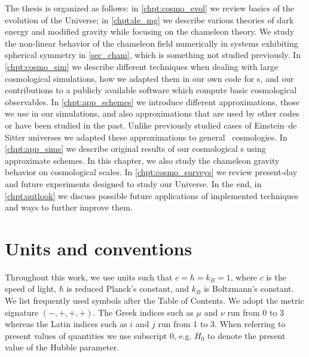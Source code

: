 The thesis is organized as follows: in \autoref{chpt:cosmo_evol} we review basics of the evolution of the Universe; in \autoref{chpt:de_mg} we describe various theories of dark energy and modified gravity while focusing on the chameleon theory. We study the non-linear behavior of the chameleon field numerically in systems exhibiting spherical symmetry in \autoref{sec_cham}, which is something not studied previously. In \autoref{chpt:cosmo_sim} we describe different techniques when dealing with large cosmological simulations, how we adapted them in our own code for \nbodysim s, and our contributions to a publicly available software  which compute basic cosmological observables. In \autoref{chpt:app_schemes} we introduce different approximations, those we use in our simulations, and also approximations that are used by other codes or have been studied in the past. Unlike previously studied cases of Einstein--de Sitter universes we adapted these approximations to general \LCDM\ cosmologies. In \autoref{chpt:app_sims} we describe original results of our cosmological \nbodysim s using approximate schemes. In this chapter, we also study the chameleon gravity behavior on cosmological scales. In \autoref{chpt:cosmo_surveys} we review present-day and future experiments designed to study our Universe. In the end, in \autoref{chpt:outlook} we discuss possible future applications of implemented techniques and ways to further improve them.

\section*{Units and conventions}
Throughout this work, we use units such that $c=\hbar=k_B=1$, where $c$ is the speed of light, $\hbar$ is reduced Planck's constant, and $k_B$ is Boltzmann's constant. We list frequently used symbols after the Table of Contents. We adopt the metric signature $(-, +, +, +)$. The Greek indices such as $\mu$ and $\nu$ run from 0 to 3 whereas the Latin indices such as $i$ and $j$ run from 1 to 3. When referring to present values of quantities we use subscript $0$, e.g. $H_0$ to denote the present value of the Hubble parameter.